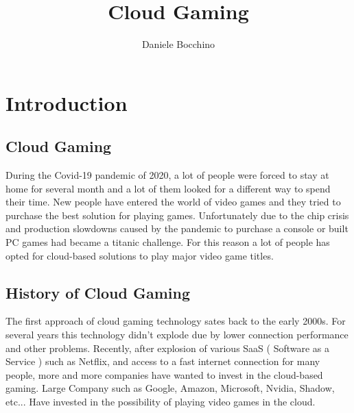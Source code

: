 \documentclass[a4paper,12pt]{report}
\begin{document}
  

\title{Cloud Gaming}
\author{Daniele Bocchino}


\beforepreface
\afterpreface
%
%
%			
\chapter{Introduction}
\label{cap1}
%
%
\section{Cloud Gaming}
During the Covid-19 pandemic of 2020, a lot of people were forced to stay at home for several month and  a lot of them looked for a different way to spend their time. New people have entered the world of video games and they tried to purchase the best solution for playing games. Unfortunately due to the chip crisis and production slowdowns caused by the pandemic to purchase a console or built PC games had became a titanic challenge. For this reason a lot of people has opted for cloud-based solutions to play major video game titles.\\
%
\section{History of Cloud Gaming}
The first approach of cloud gaming technology sates back to the early 2000s. For several years this technology didn't explode due by lower connection performance  and other problems. Recently, after explosion of various SaaS ( Software as a Service ) such as Netflix, and access to a fast internet connection for many people, more and more companies have wanted to invest in the cloud-based gaming. Large Company such as Google, Amazon, Microsoft, Nvidia, Shadow, etc... Have invested in the possibility of playing video games in the cloud.\\
\newpage
%
\end{document}
